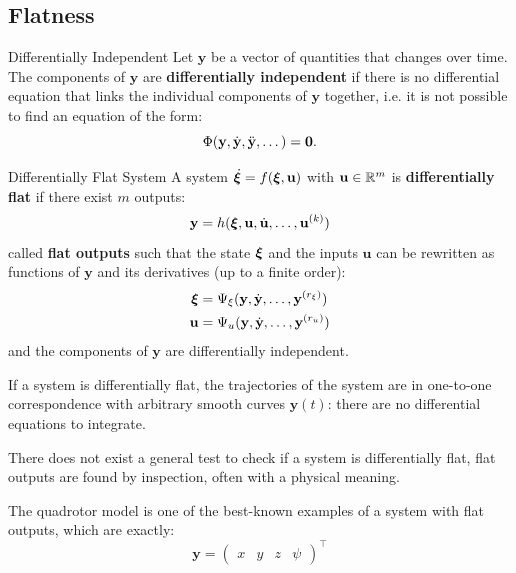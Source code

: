 \documentclass[10pt, a4paper]{report}
\newcommand{\y}{{\mathbf y}}
\begin{document}
\subsection{Flatness}
\begin{boxdefinition}{Differentially Independent}{}
    Let $\mathbf y$ be a vector of quantities that changes over time. The components of  $\mathbf y$ are \textbf{differentially independent} if there is no differential equation that links the individual components of $\mathbf y$ together, i.e. it is not possible to find an equation of the form:\begin{equation}
        \Phi(\mathbf y,{\dot{\mathbf y}},{\ddot{\mathbf y}},\dots)=\mathbf 0.
    \end{equation}
\end{boxdefinition}
\begin{boxdefinition}{Differentially Flat System}{}
    A system $\dot{{\boldsymbol{\xi}}}=f({\boldsymbol{\xi}},\mathbf u)$ with $\mathbf u\in{\mathbb R}^m$ is \textbf{differentially flat} if there exist $m$ outputs:\begin{equation}
        \mathbf y = h({\boldsymbol{\xi}},\mathbf u,\dot{\mathbf u},\dots,\mathbf u^{(k)})
    \end{equation}
    called \textbf{flat outputs} such that the state ${\boldsymbol{\xi}}$ and the inputs $\mathbf u$ can be rewritten as functions of $\mathbf y$ and its derivatives (up to a finite order):\begin{align}
        {\boldsymbol{\xi}}&= \Psi_\xi(\mathbf y,\dot{\mathbf y},\dots, \mathbf y^{(r_\xi)})\\
        \mathbf u&=\Psi_u(\mathbf y,\dot{\mathbf y},\dots, \mathbf y^{(r_u)})
    \end{align}
    and the components of $\mathbf y$ are differentially independent.
\end{boxdefinition}
If a system is differentially flat, the trajectories of the system are in one-to-one correspondence
with arbitrary smooth curves $\mathbf y(t)$: there are no differential equations to integrate.
\begin{boxobservation}{}{}
    There does not exist a general test to check if a system is differentially flat, flat outputs are found by inspection, often
    with a physical meaning.
\end{boxobservation}
\noindent The quadrotor model is one of the best-known examples of a system with flat outputs, which are exactly:\begin{equation}
    \y=\begin{pmatrix}
        x&y&z&\psi
    \end{pmatrix}^\top
\end{equation}
\end{document}
